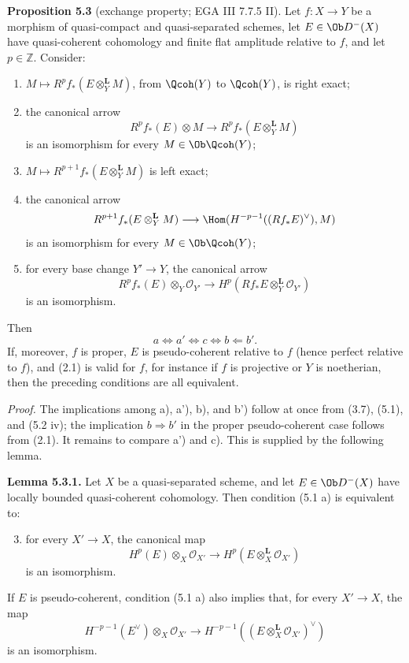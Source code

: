 \textbf{Proposition 5.3} (exchange property; EGA III 7.7.5 II). Let \(f:X\to Y\) be a morphism of quasi-compact and quasi-separated schemes, let \(E\in\Ob D^{-}(X)\) have quasi-coherent cohomology and finite flat amplitude relative to \(f\), and let \(p\in\mathbb Z\). Consider:
\begin{enumerate}[label=\alph*)]
\item \(M\mapsto R^pf_*(E\otimes_Y^{\mathbf L}M)\), from \(\Qcoh(Y)\) to \(\Qcoh(Y)\), is right exact;
\item[\(\mathrm a'\)] the canonical arrow
\[
 R^pf_*(E)\otimes M
 \longrightarrow
 R^pf_*(E\otimes_Y^{\mathbf L}M)
\]
is an isomorphism for every \(M\in\Ob\Qcoh(Y)\);
\item[\(\mathrm b\)] \(M\mapsto R^{p+1}f_*(E\otimes_Y^{\mathbf L}M)\) is left exact;
\item[\(\mathrm b'\)] the canonical arrow
\[
 R^{p+1}f_*(E\otimes_Y^{\mathbf L}M)
 \longrightarrow
 \Hom(H^{-p-1}((Rf_*E)^{\vee}),M)
\]
is an isomorphism for every \(M\in\Ob\Qcoh(Y)\);
\item[\(\mathrm c\)] for every base change \(Y'\to Y\), the canonical arrow
\[
 R^pf_*(E)\otimes_Y\mathcal O_{Y'}
 \longrightarrow
 H^p(Rf_*E\otimes_Y^{\mathbf L}\mathcal O_{Y'})
\]
is an isomorphism.
\end{enumerate}
Then
\[
 a\Longleftrightarrow a'\Longleftrightarrow c\Longleftrightarrow b\Longleftarrow b'.
\]
If, moreover, \(f\) is proper, \(E\) is pseudo-coherent relative to \(f\) (hence perfect relative to \(f\)), and (2.1) is valid for \(f\), for instance if \(f\) is projective or \(Y\) is noetherian, then the preceding conditions are all equivalent.

\emph{Proof.} The implications among a), a'), b), and b') follow at once from (3.7), (5.1), and (5.2 iv); the implication \(b\Rightarrow b'\) in the proper pseudo-coherent case follows from (2.1). It remains to compare a') and c). This is supplied by the following lemma.

\textbf{Lemma 5.3.1.} Let \(X\) be a quasi-separated scheme, and let \(E\in\Ob D^{-}(X)\) have locally bounded quasi-coherent cohomology. Then condition (5.1 a) is equivalent to:
\begin{enumerate}[label=\alph*)]
\setcounter{enumi}{2}
\item for every \(X'\to X\), the canonical map
\[
 H^p(E)\otimes_X\mathcal O_{X'}
 \longrightarrow
 H^p(E\otimes_X^{\mathbf L}\mathcal O_{X'})
\]
is an isomorphism.
\end{enumerate}
If \(E\) is pseudo-coherent, condition (5.1 a) also implies that, for every \(X'\to X\), the map
\[
 H^{-p-1}(E^{\vee})\otimes_X\mathcal O_{X'}
 \longrightarrow
 H^{-p-1}((E\otimes_X^{\mathbf L}\mathcal O_{X'})^{\vee})
\tag{5.3.1.1}
\]
is an isomorphism.

